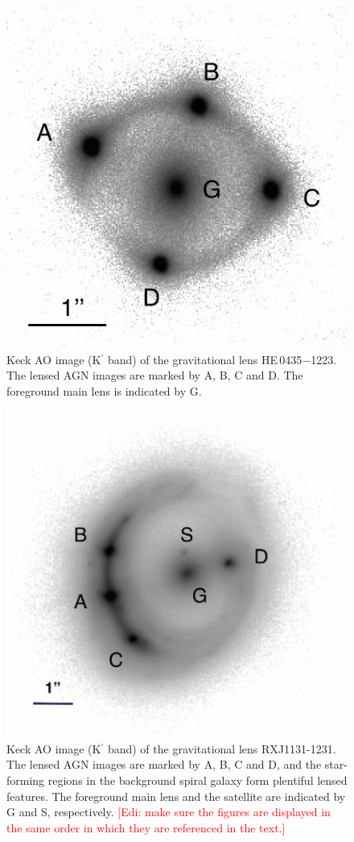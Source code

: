 \documentclass[useAMS,usenatbib]{mnras}
\newcommand\todo[1]{\textcolor{red}{#1}}
\newcommand\he{HE\,0435$-$1223}
\begin{document}
\begin{figure}
\includegraphics*[scale=1]{HE0435-1231.png}
\caption{Keck AO image (K$^\prime$ band) of the gravitational lens \he. The lensed AGN images are marked by A, B, C and D. The foreground main lens is indicated by G.}
\label{fig:HE0435image}
\end{figure}

\begin{figure}
\includegraphics*[scale=0.56]{RXJ1131_image3.eps}
\caption{Keck AO image (K$^\prime$ band) of the gravitational lens RXJ1131-1231. The lensed AGN images are marked by A, B, C and D, and the star-forming regions in the background spiral galaxy form plentiful lensed features. The foreground main lens and the satellite are indicated by G and S, respectively. \todo{[Edi: make sure the figures are displayed in the same order in which they are referenced in the text.]}}
\label{fig:RXJ1131image}
\end{figure}
\end{document}

